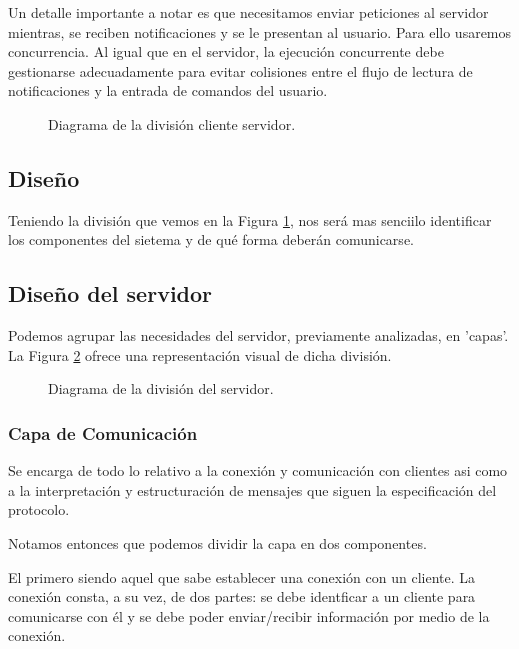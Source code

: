 \documentclass{replab}
\begin{document}
    Un detalle importante a notar es que necesitamos enviar peticiones
    al servidor mientras, se reciben notificaciones y se le presentan
    al usuario. Para ello usaremos concurrencia. Al igual que en el
    servidor, la ejecución concurrente debe gestionarse adecuadamente
    para evitar colisiones entre el flujo de lectura de notificaciones
    y la entrada de comandos del usuario.

    \begin{figure}[htbp]
		\centering
        
		\caption{Diagrama de la división cliente servidor.}
		\label{fig:cliente_servidor}
	\end{figure}

    \subsection{Diseño}

    Teniendo la división que vemos en la Figura
    \ref{fig:cliente_servidor}, nos será mas senciilo identificar los
    componentes del sietema y de qué forma deberán comunicarse.
    
    \subsection{Diseño del servidor}

    Podemos agrupar las necesidades del servidor, previamente
    analizadas, en 'capas'. La Figura \ref{fig:div_serv} ofrece una
    representación visual de dicha división.

    \begin{figure}[htbp]
		\centering
        
		\caption{Diagrama de la división del servidor.}
		\label{fig:div_serv}
	\end{figure}

    \subsubsection{Capa de Comunicación}

    Se encarga de todo lo relativo a la conexión y comunicación con
    clientes asi como a la interpretación y estructuración de mensajes
    que siguen la especificación del protocolo.

    Notamos entonces que podemos dividir la capa en dos componentes.

    El primero siendo aquel que sabe establecer una conexión con un
    cliente. La conexión consta, a su vez, de dos partes: se debe
    identficar a un cliente para comunicarse con él y se debe poder
    enviar/recibir información por medio de la conexión. 
\end{document}
